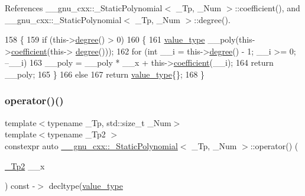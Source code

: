 References \+\_\+\+\_\+gnu\+\_\+cxx\+::\+\_\+\+Static\+Polynomial$<$ \+\_\+\+Tp, \+\_\+\+Num $>$\+::coefficient(), and \+\_\+\+\_\+gnu\+\_\+cxx\+::\+\_\+\+Static\+Polynomial$<$ \+\_\+\+Tp, \+\_\+\+Num $>$\+::degree().


\begin{DoxyCode}
158       \{
159         \textcolor{keywordflow}{if} (this->\hyperlink{class____gnu__cxx_1_1__StaticPolynomial_a56b1719601ce049e6dd768e10edfd171}{degree}() > 0)
160           \{
161             \hyperlink{class____gnu__cxx_1_1__StaticPolynomial_af23110f5a002cd6caa3542df7cf35284}{value\_type} \_\_poly(this->\hyperlink{class____gnu__cxx_1_1__StaticPolynomial_a412fc570171031ff0f45db048dfda225}{coefficient}(this->
      \hyperlink{class____gnu__cxx_1_1__StaticPolynomial_a56b1719601ce049e6dd768e10edfd171}{degree}()));
162             \textcolor{keywordflow}{for} (\textcolor{keywordtype}{int} \_\_i = this->\hyperlink{class____gnu__cxx_1_1__StaticPolynomial_a56b1719601ce049e6dd768e10edfd171}{degree}() - 1; \_\_i >= 0; --\_\_i)
163               \_\_poly = \_\_poly * \_\_x + this->\hyperlink{class____gnu__cxx_1_1__StaticPolynomial_a412fc570171031ff0f45db048dfda225}{coefficient}(\_\_i);
164             \textcolor{keywordflow}{return} \_\_poly;
165           \}
166         \textcolor{keywordflow}{else}
167           \textcolor{keywordflow}{return} \hyperlink{class____gnu__cxx_1_1__StaticPolynomial_af23110f5a002cd6caa3542df7cf35284}{value\_type}\{\};
168       \}
\end{DoxyCode}
\mbox{\label{class____gnu__cxx_1_1__StaticPolynomial_acdaa58d8a8e01e24957828795bc34f7f}} 
\subsubsection{\texorpdfstring{operator()()}{operator()()}\hspace{0.1cm}{\footnotesize\ttfamily [2/4]}}
{\footnotesize\ttfamily template$<$typename \+\_\+\+Tp, std\+::size\+\_\+t \+\_\+\+Num$>$ \\
template$<$typename \+\_\+\+Tp2 $>$ \\
constexpr auto \hyperlink{class____gnu__cxx_1_1__StaticPolynomial}{\+\_\+\+\_\+gnu\+\_\+cxx\+::\+\_\+\+Static\+Polynomial}$<$ \+\_\+\+Tp, \+\_\+\+Num $>$\+::operator() (\begin{DoxyParamCaption}\item[{\hyperlink{class____gnu__cxx_1_1__StaticPolynomial_a111ee5aedd5ae8c0b4d8fa8f29d1f9b9}{\+\_\+\+Tp2}}]{\+\_\+\+\_\+x }\end{DoxyParamCaption}) const -\/$>$ decltype(\hyperlink{class____gnu__cxx_1_1__StaticPolynomial_af23110f5a002cd6caa3542df7cf35284}{value\+\_\+type}\hspace{0.3cm}{\ttfamily [inline]}}

